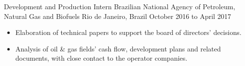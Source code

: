 \cvjob
    {Development and Production Intern}
    {Brazilian National Agency of Petroleum, Natural Gas and Biofuels}
    {Rio de Janeiro, Brazil}
    {October 2016 to April 2017}

\begin{itemize}
    \item Elaboration of technical papers to support the board of directors' decisions.
    \item Analysis of oil \& gas fields' cash flow, development plans and related documents, with close contact to the
    operator companies.
\end{itemize}
